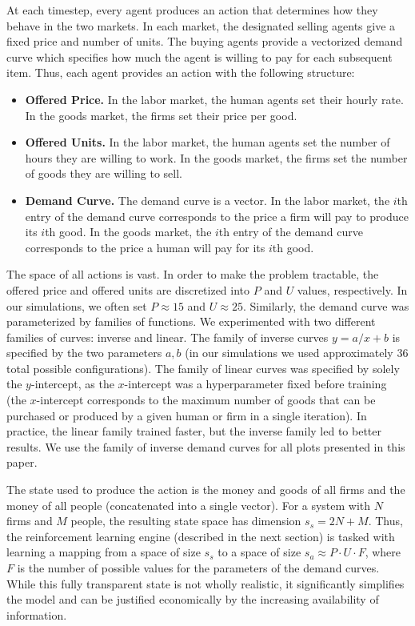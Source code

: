 \documentclass[twoside,twocolumn]{article}
\begin{document}
At each timestep, every agent produces an action that determines how they behave in the two markets. In each market, the designated selling agents give a fixed price and number of units. The buying agents provide a vectorized demand curve which specifies how much the agent is willing to pay for each subsequent item. Thus, each agent provides an action with the following structure:
\begin{itemize}
  \item \textbf{Offered Price.} In the labor market, the human agents set their hourly rate. In the goods market, the firms set their price per good.
  \item \textbf{Offered Units.} In the labor market, the human agents set the number of hours they are willing to work. In the goods market, the firms set the number of goods they are willing to sell.
  \item \textbf{Demand Curve.} The demand curve is a vector. In the labor market, the $i$th entry of the demand curve corresponds to the price a firm will pay to produce its $i$th good. In the goods market, the $i$th entry of the demand curve corresponds to the price a human will pay for its $i$th good.
\end{itemize}

The space of all actions is vast. In order to make the problem tractable, the offered price and offered units are discretized into $P$ and $U$ values, respectively. In our simulations, we often set $P \approx 15$ and $U \approx 25$. Similarly, the demand curve was parameterized by families of functions. We experimented with two different families of curves: inverse and linear. The family of inverse curves $y = a/x + b$ is specified by the two parameters $a, b$ (in our simulations we used approximately 36 total possible configurations). The family of linear curves was specified by solely the $y$-intercept, as the $x$-intercept was a hyperparameter fixed before training (the $x$-intercept corresponds to the maximum number of goods that can be purchased or produced by a given human or firm in a single iteration). In practice, the linear family trained faster, but the inverse family led to better results. We use the family of inverse demand curves for all plots presented in this paper.

\medskip

The state used to produce the action is the money and goods of all firms and the money of all people (concatenated into a single vector). For a system with $N$ firms and $M$ people, the resulting state space has dimension $s_s = 2N + M$. Thus, the reinforcement learning engine (described in the next section) is tasked with learning a mapping from a space of size $s_s$ to a space of size $s_a \approx P \cdot U \cdot F$, where $F$ is the number of possible values for the parameters of the demand curves. While this fully transparent state is not wholly realistic, it significantly simplifies the model and can be justified economically by the increasing availability of information.
\end{document}
